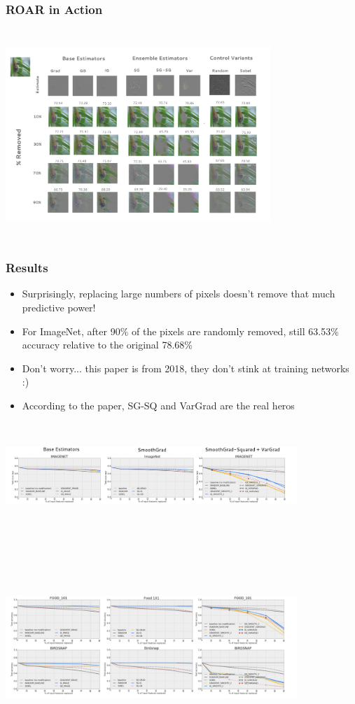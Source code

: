 \documentclass{beamer}
\theoremstyle{mystyle}
\begin{document}
\begin{frame}
	\frametitle{ROAR in Action}
	\includegraphics[height=8cm, width=10cm]{ROAR_methods.png}
\end{frame}
\begin{frame}
	\frametitle{Results}
	\begin{itemize}
		\item Surprisingly, replacing large numbers of pixels doesn't remove that much predictive power! \pause
		\item For ImageNet, after 90\% of the pixels are randomly removed, still 63.53\% accuracy relative to the original 78.68\% \pause
		\item Don't worry... this paper is from 2018, they don't stink at training networks :)\pause
		\item According to the paper, SG-SQ and VarGrad are the real heros \pause
	\end{itemize} 
	\includegraphics[width=11cm, height=4cm]{ImgNetSG.png}

\end{frame}
\begin{frame}
	\includegraphics[width=11cm, height=8cm]{other2SG.png}
\end{frame}
\end{document}
